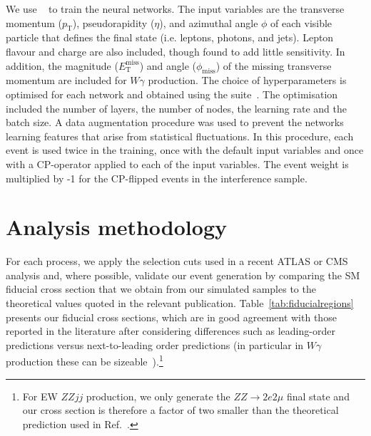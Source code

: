 \documentclass[twocolumn,preprintnumbers,superscriptaddress,nofootinbib,aps,prd,floatfix]{revtex4}
\begin{document}
We use {}~\cite{Abadi:2016kic} to train the neural networks. The input variables are the transverse momentum ($p_\textrm{T}$), pseudorapidity ($\eta$), and azimuthal angle $\phi$ of each visible particle that defines the final state (i.e. leptons, photons, and jets). Lepton flavour and charge are also included, though found to add little sensitivity. In addition, the magnitude ($E_\textrm{T}^\textrm{miss}$) and angle ($\phi_\textrm{miss}$) of the missing transverse momentum are included for  $W\gamma$ production. The choice of hyperparameters is optimised for each network and obtained using the {} suite~\cite{keras,omalley2019kerastuner}. The optimisation included the number of layers, the number of nodes, the learning rate and the batch size. 
A data augmentation procedure was used to prevent the networks learning features that arise from statistical fluctuations. In this procedure, each event is used twice in the training, once with the default input variables and once with a CP-operator applied to each of the input variables. The event weight is multiplied by -1 for the CP-flipped events in the interference sample. 

\section{Analysis methodology}
\label{sec:limit}

For each process, we apply the selection cuts used in a recent ATLAS or CMS analysis and, where possible, validate our event generation by comparing the SM fiducial cross section that we obtain from our simulated samples to the theoretical values quoted in the relevant publication. Table~\ref{tab:fiducialregions} presents our fiducial cross sections, which are in good agreement with those reported in the literature after considering differences such as leading-order predictions versus next-to-leading order predictions (in particular in $W\gamma$ production these can be sizeable~\cite{Ohnemus:1992jn,Baur:1993ir}).\footnote{For EW $ZZjj$ production, we only generate the $ZZ\rightarrow 2e2\mu$ final state and our cross section is therefore a factor of two smaller than the theoretical prediction used in Ref.~\cite{ATLAS:2020nlt}.} 
\end{document}
